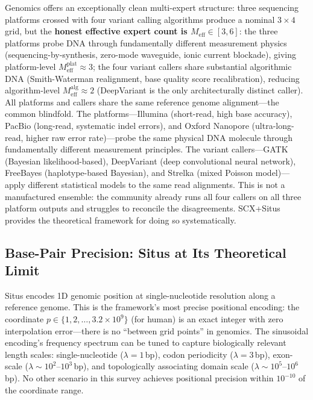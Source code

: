 \documentclass[12pt,a4paper]{article}
\begin{document}
Genomics offers an exceptionally clean multi-expert structure: three sequencing platforms crossed with four variant calling algorithms produce a nominal $3 \times 4$ grid, but the \textbf{honest effective expert count is $M_{\text{eff}} \in [3,6]$}: the three platforms probe DNA through fundamentally different measurement physics (sequencing-by-synthesis, zero-mode waveguide, ionic current blockade), giving platform-level $M_{\text{eff}}^{\text{plat}} \approx 3$; the four variant callers share substantial algorithmic DNA (Smith-Waterman realignment, base quality score recalibration), reducing algorithm-level $M_{\text{eff}}^{\text{alg}} \approx 2$ (DeepVariant is the only architecturally distinct caller). All platforms and callers share the same reference genome alignment---the common blindfold. The platforms---Illumina (short-read, high base accuracy), PacBio (long-read, systematic indel errors), and Oxford Nanopore (ultra-long-read, higher raw error rate)---probe the same physical DNA molecule through fundamentally different measurement principles. The variant callers---GATK\cite{depristo2011} (Bayesian likelihood-based), DeepVariant\cite{poplin2018} (deep convolutional neural network), FreeBayes\cite{garrison2012} (haplotype-based Bayesian), and Strelka\cite{kim2018} (mixed Poisson model)---apply different statistical models to the same read alignments. This is not a manufactured ensemble: the community already runs all four callers on all three platform outputs and struggles to reconcile the disagreements. SCX+Situs provides the theoretical framework for doing so systematically.

\subsection{Base-Pair Precision: Situs at Its Theoretical Limit}

Situs encodes 1D genomic position at single-nucleotide resolution along a reference genome. This is the framework's most precise positional encoding: the coordinate $p \in \{1, 2, \ldots, 3.2 \times 10^9\}$ (for human) is an exact integer with zero interpolation error---there is no ``between grid points'' in genomics. The sinusoidal encoding's frequency spectrum can be tuned to capture biologically relevant length scales: single-nucleotide ($\lambda = 1$\,bp), codon periodicity ($\lambda = 3$\,bp), exon-scale ($\lambda \sim 10^2$--$10^3$\,bp), and topologically associating domain scale ($\lambda \sim 10^5$--$10^6$\,bp). No other scenario in this survey achieves positional precision within $10^{-10}$ of the coordinate range.
\end{document}
